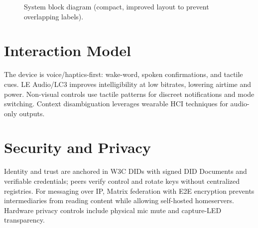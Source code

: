 \documentclass[10pt,journal,compsoc]{IEEEtran}
\begin{document}
\begin{figure}[!t]
\centering
{}
\caption{System block diagram (compact, improved layout to prevent overlapping labels).}
\label{fig:block}
\end{figure}

\section{Interaction Model}
The device is voice/haptics-first: wake-word, spoken confirmations, and tactile cues. LE Audio/LC3 improves intelligibility at low bitrates, lowering airtime and power. Non-visual controls use tactile patterns for discreet notifications and mode switching. Context disambiguation leverages wearable HCI techniques for audio-only outputs.

\section{Security and Privacy}
Identity and trust are anchored in W3C DIDs with signed DID Documents and verifiable credentials; peers verify control and rotate keys without centralized registries. For messaging over IP, Matrix federation with E2E encryption prevents intermediaries from reading content while allowing self-hosted homeservers. Hardware privacy controls include physical mic mute and capture-LED transparency.
\end{document}
